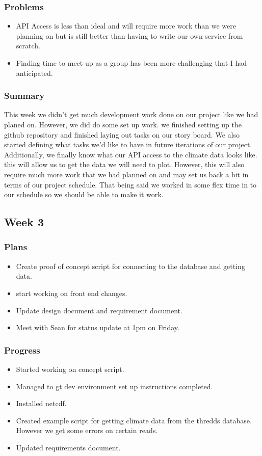 \documentclass[onecolumn, draftclsnofoot,10pt, compsoc]{article}
\begin{document}
			\subsubsection{Problems}
				\begin{itemize}
					\item API Access is less than ideal and will require more work than we were planning on but is still better than having to write our own service from scratch.
					\item Finding time to meet up as a group has been more challenging that I had anticipated.
				\end{itemize}

			\subsubsection{Summary}
			This week we didn't get much development work done on our project like we had planed on. However, we did do some set up work. we finished setting up the github repository and finished laying out tasks on our story board. We also started defining what tasks we'd like to have in future iterations of our project. Additionally, we finally know what our API access to the climate data looks like. this will allow us to get the data we will need to plot. However, this will also require much more work that we had planned on and may set us back a bit in terms of our project schedule. That being said we worked in some flex time in to our schedule so we should be able to make it work.\\

		\subsection{Week 3}
			\subsubsection{Plans}
				\begin{itemize}
					\item Create proof of concept script for connecting to the database and getting data.
					\item start working on front end changes.
					\item Update design document and requirement document.
					\item Meet with Sean for status update at 1pm on Friday.
				\end{itemize}
			\subsubsection{Progress}
				\begin{itemize}
					\item Started working on concept script.
					\item Managed to gt dev environment set up instructions completed.
					\item Installed netcdf.
					\item Created example script for getting climate data from the thredds database. However we get some errors on certain reads.
					\item Updated requirements document.
				\end{itemize}
\end{document}
